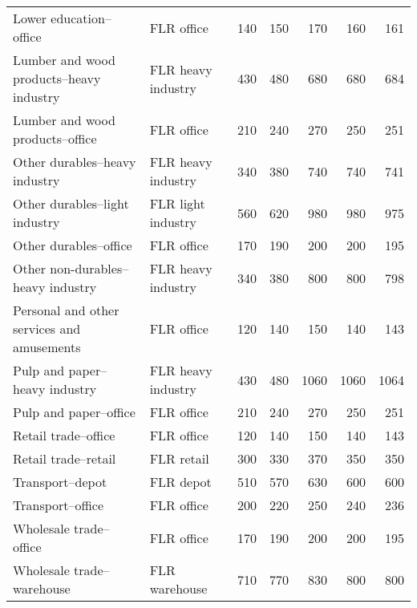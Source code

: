 \begin{sidewaystable}
\begin{tabular}{llrrrrr}
\rowcolor{gray!10}Lower education--office & FLR office & 140 & 150 & 170 & 160 & 161 \\
Lumber and wood products--heavy industry & FLR heavy industry & 430 & 480 & 680 & 680 & 684 \\
\rowcolor{gray!10}Lumber and wood products--office & FLR office & 210 & 240 & 270 & 250 & 251 \\
Other durables--heavy industry & FLR heavy industry & 340 & 380 & 740 & 740 & 741 \\
\rowcolor{gray!10}Other durables--light industry & FLR light industry & 560 & 620 & 980 & 980 & 975 \\
Other durables--office & FLR office & 170 & 190 & 200 & 200 & 195 \\
\rowcolor{gray!10}Other non-durables--heavy industry & FLR heavy industry & 340 & 380 & 800 & 800 & 798 \\
Personal and other services and amusements & FLR office & 120 & 140 & 150 & 140 & 143 \\
\rowcolor{gray!10}Pulp and paper--heavy industry & FLR heavy industry & 430 & 480 & 1060 & 1060 & 1064 \\
Pulp and paper--office & FLR office & 210 & 240 & 270 & 250 & 251 \\
\rowcolor{gray!10}Retail trade--office & FLR office & 120 & 140 & 150 & 140 & 143 \\
Retail trade--retail & FLR retail & 300 & 330 & 370 & 350 & 350 \\
\rowcolor{gray!10}Transport--depot & FLR depot & 510 & 570 & 630 & 600 & 600 \\
Transport--office & FLR office & 200 & 220 & 250 & 240 & 236 \\
\rowcolor{gray!10}Wholesale trade--office & FLR office & 170 & 190 & 200 & 200 & 195 \\
Wholesale trade--warehouse & FLR warehouse & 710 & 770 & 830 & 800 & 800 \\
\hline
\end{tabular}
\end{sidewaystable}